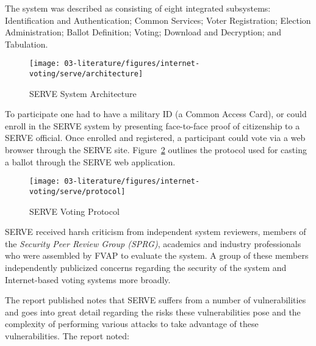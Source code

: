 The system was described as consisting of eight integrated subsystems:
Identification and Authentication; Common Services; Voter Registration; Election
Administration; Ballot Definition; Voting; Download and Decryption; and
Tabulation.

\begin{figure}[H]
    \centering
    \texttt{[image: 03-literature/figures/internet-voting/serve/architecture]}
    \caption{SERVE System Architecture~\cite{internet-voting-survey}}\label{fig:serve-architecture}%
\end{figure}


To participate one had to have a military ID (a Common Access Card), or could
enroll in the SERVE system by presenting face-to-face proof of citizenship to a
SERVE official. Once enrolled and registered, a participant could vote via a web
browser through the SERVE site. Figure~\ref{fig:serve-voting-protocol} outlines
the protocol used for casting a ballot through the SERVE web application.

\begin{figure}[H]
    \centering
    \texttt{[image: 03-literature/figures/internet-voting/serve/protocol]}
    \caption{SERVE Voting Protocol~\cite{internet-voting-survey}}\label{fig:serve-voting-protocol}%
\end{figure}

SERVE received harsh criticism from independent system reviewers, members of the
\emph{Security Peer Review Group (SPRG)}, academics and industry professionals
who were assembled by FVAP to evaluate the system. A group of these members
independently publicized concerns regarding the security of the system and
Internet-based voting systems more broadly.\cite{serve-analysis}

The report published notes that SERVE suffers from a number of vulnerabilities
and goes into great detail regarding the risks these vulnerabilities pose and
the complexity of performing various attacks to take advantage of these
vulnerabilities. The report noted:\cite{serve-analysis}

